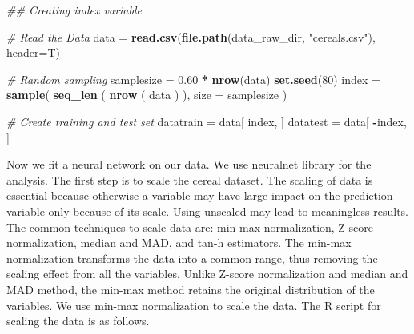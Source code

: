 \documentclass[]{book}
\newenvironment{Shaded}{\begin{snugshade}}{\end{snugshade}}
\newcommand{\CommentTok}[1]{\textcolor[rgb]{0.56,0.35,0.01}{\textit{#1}}}
\newcommand{\DataTypeTok}[1]{\textcolor[rgb]{0.13,0.29,0.53}{#1}}
\newcommand{\DecValTok}[1]{\textcolor[rgb]{0.00,0.00,0.81}{#1}}
\newcommand{\FloatTok}[1]{\textcolor[rgb]{0.00,0.00,0.81}{#1}}
\newcommand{\KeywordTok}[1]{\textcolor[rgb]{0.13,0.29,0.53}{\textbf{#1}}}
\newcommand{\NormalTok}[1]{#1}
\newcommand{\OperatorTok}[1]{\textcolor[rgb]{0.81,0.36,0.00}{\textbf{#1}}}
\newcommand{\StringTok}[1]{\textcolor[rgb]{0.31,0.60,0.02}{#1}}
\begin{document}
\begin{Shaded}
\begin{Highlighting}[]
\CommentTok{## Creating index variable }

\CommentTok{# Read the Data}
\NormalTok{data =}\StringTok{ }\KeywordTok{read.csv}\NormalTok{(}\KeywordTok{file.path}\NormalTok{(data_raw_dir, }\StringTok{"cereals.csv"}\NormalTok{), }\DataTypeTok{header=}\NormalTok{T)}

\CommentTok{# Random sampling}
\NormalTok{samplesize =}\StringTok{ }\FloatTok{0.60} \OperatorTok{*}\StringTok{ }\KeywordTok{nrow}\NormalTok{(data)}
\KeywordTok{set.seed}\NormalTok{(}\DecValTok{80}\NormalTok{)}
\NormalTok{index =}\StringTok{ }\KeywordTok{sample}\NormalTok{( }\KeywordTok{seq_len}\NormalTok{ ( }\KeywordTok{nrow}\NormalTok{ ( data ) ), }\DataTypeTok{size =}\NormalTok{ samplesize )}

\CommentTok{# Create training and test set  }
\NormalTok{datatrain =}\StringTok{ }\NormalTok{data[ index, ]}
\NormalTok{datatest =}\StringTok{ }\NormalTok{data[ }\OperatorTok{-}\NormalTok{index, ]}
\end{Highlighting}
\end{Shaded}

\begin{Shaded}
\end{Shaded}

Now we fit a neural network on our data. We use neuralnet library for the analysis. The first step is to scale the cereal dataset. The scaling of data is essential because otherwise a variable may have large impact on the prediction variable only because of its scale. Using unscaled may lead to meaningless results. The common techniques to scale data are: min-max normalization, Z-score normalization, median and MAD, and tan-h estimators. The min-max normalization transforms the data into a common range, thus removing the scaling effect from all the variables. Unlike Z-score normalization and median and MAD method, the min-max method retains the original distribution of the variables. We use min-max normalization to scale the data. The R script for scaling the data is as follows.
\end{document}
